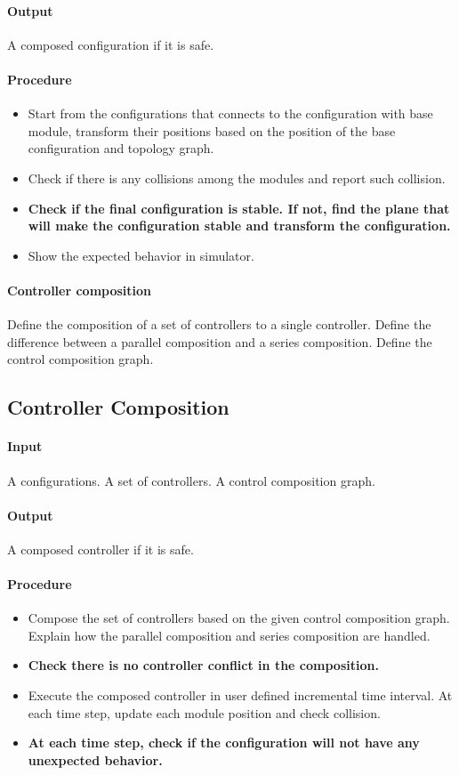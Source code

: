 \documentclass[conference]{IEEEtran}
\begin{document}
\paragraph{Output}
A composed configuration if it is safe.
\paragraph{Procedure}
\begin{itemize}
\item Start from the configurations that connects to the configuration with base module, transform their positions based on the position of the base configuration and topology graph.
\item Check if there is any collisions among the modules and report such collision.
\item \textbf{Check if the final configuration is stable. If not, find the plane that will make the configuration stable and transform the configuration.}
\item Show the expected behavior in simulator.
\end{itemize}

\paragraph{Controller composition}
Define the composition of a set of controllers to a single controller. Define the difference between a parallel composition and a series composition. Define the control composition graph.

\subsection{Controller Composition}
\paragraph{Input}
A configurations. A set of controllers. A control composition graph.
\paragraph{Output}
A composed controller if it is safe.
\paragraph{Procedure}
\begin{itemize}
\item Compose the set of controllers based on the given control composition graph. Explain how the parallel composition and series composition are handled.
\item\textbf{Check there is no controller conflict in the composition.}
\item Execute the composed controller in user defined incremental time interval. At each time step, update each module position and check collision.
\item \textbf{At each time step, check if the configuration will not have any unexpected behavior.}
\end{itemize}
\end{document}
